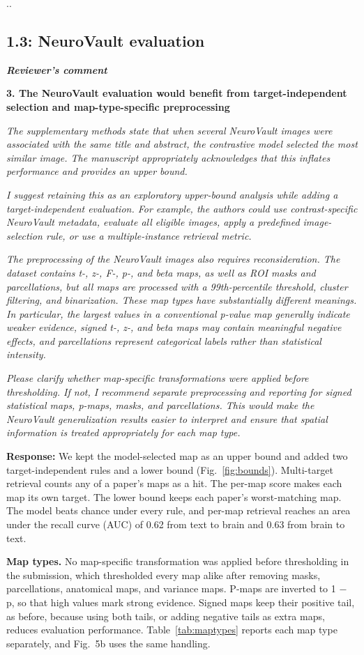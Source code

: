 \documentclass[11pt]{article}
\newcommand{\revqopen}{\begin{lrbox}{\revbox}\begin{minipage}{\dimexpr\linewidth-2\fboxsep\relax}%
  \setlength{\parskip}{0.45em}\small\itshape\color{black!85}}
\newcommand{\revqclose}{\end{minipage}\end{lrbox}\colorbox{quotebg}{\usebox{\revbox}}}
\newcommand{\revqpar}{\revqclose\par\nointerlineskip\noindent\revqopen}
\newenvironment{revquote}{\par\smallskip\setlength{\parskip}{0pt}\noindent\revqopen
  {\small\upshape\bfseries\color{black!70}Reviewer's comment}\par}%
  {\revqclose\par\medskip}
\newcommand{\response}{\textbf{Response:} }
\providecommand{\mslink}[2]{#2}
\providecommand{\mspg}[1]{0}
\DeclareRobustCommand{\mscap}[2]{\begingroup\edef\x{\endgroup\noexpand\mslink{\mspg{#1}}}\x{#2}}  %
\newcommand{\msfig}[1]{\mscap{Fig.#1}{Fig.~#1}}
\newcommand{\revcomment}[2]{\FloatBarrier\phantomsection\revzero#1..\relax{\label{sec:#1}}%
  {\addcontentsline{toc}{subsection}{#1: #2}\subsection*{#1: #2}\label{sec:#1}}}
\begin{document}
\revcomment{1.3}{NeuroVault evaluation}\begin{revquote}
\textbf{3. The NeuroVault evaluation would benefit from target-independent selection and map-type-specific preprocessing}
\revqpar The supplementary methods state that when several NeuroVault images were associated with the same title and abstract, the contrastive model selected the most similar image. The manuscript appropriately acknowledges that this inflates performance and provides an upper bound.
\revqpar I suggest retaining this as an exploratory upper-bound analysis while adding a target-independent evaluation. For example, the authors could use contrast-specific NeuroVault metadata, evaluate all eligible images, apply a predefined image-selection rule, or use a multiple-instance retrieval metric.
\revqpar The preprocessing of the NeuroVault images also requires reconsideration. The dataset contains t-, z-, F-, p-, and beta maps, as well as ROI masks and parcellations, but all maps are processed with a 99th-percentile threshold, cluster filtering, and binarization. These map types have substantially different meanings. In particular, the largest values in a conventional p-value map generally indicate weaker evidence, signed t-, z-, and beta maps may contain meaningful negative effects, and parcellations represent categorical labels rather than statistical intensity.
\revqpar Please clarify whether map-specific transformations were applied before thresholding. If not, I recommend separate preprocessing and reporting for signed statistical maps, p-maps, masks, and parcellations. This would make the NeuroVault generalization results easier to interpret and ensure that spatial information is treated appropriately for each map type.
\end{revquote}\response We kept the model-selected map as an upper bound and added two target-independent rules and a lower bound (Fig.~\ref{fig:bounds}). Multi-target retrieval counts any of a paper's maps as a hit. The per-map score makes each map its own target. The lower bound keeps each paper's worst-matching map. The model beats chance under every rule, and per-map retrieval reaches an area under the recall curve (AUC) of 0.62 from text to brain and 0.63 from brain to text.

\textbf{Map types.} No map-specific transformation was applied before thresholding in the submission, which thresholded every map alike after removing masks, parcellations, anatomical maps, and variance maps. P-maps are inverted to 1 $-$ p, so that high values mark strong evidence. Signed maps keep their positive tail, as before, because using both tails, or adding negative tails as extra maps, reduces evaluation performance. Table~\ref{tab:maptypes} reports each map type separately, and \msfig{5}b uses the same handling.
\end{document}
